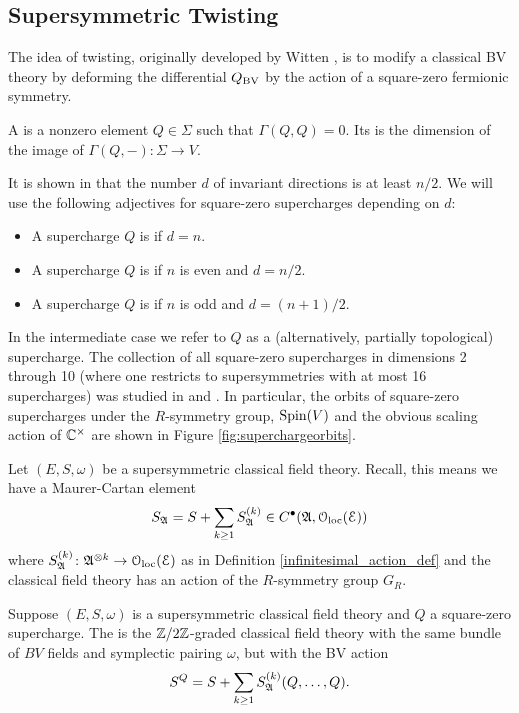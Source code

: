 \documentclass[10pt, oneside]{article}
\begin{document}
\subsection{Supersymmetric Twisting}
The idea of twisting, originally developed by Witten \cite{WittenTQFT}, is to modify a classical BV theory by deforming the differential $Q_{\mathrm{BV}}$ by the action of a square-zero fermionic symmetry. 

\begin{definition}
A  is a nonzero element $Q\in\Sigma$ such that $\Gamma(Q, Q)=0$. Its  is the dimension of the image of $\Gamma(Q, -)\colon \Sigma\rightarrow V$.
\end{definition}

It is shown in \cite[Proposition 3.25]{ElliottSafronov} that the number $d$ of invariant directions is at least $n/2$. We will use the following adjectives for square-zero supercharges depending on $d$:
\begin{itemize}
\item A supercharge $Q$ is  if $d = n$.

\item A supercharge $Q$ is  if $n$ is even and $d=n/2$.

\item A supercharge $Q$ is  if $n$ is odd and $d=(n+1)/2$.
\end{itemize}

In the intermediate case we refer to $Q$ as a  (alternatively, partially topological) supercharge. The collection of all square-zero supercharges in dimensions 2 through 10 (where one restricts to supersymmetries with at most 16 supercharges) was studied in \cite{ElliottSafronov} and \cite{EagerSaberiWalcher}. In particular, the orbits of square-zero supercharges under the $R$-symmetry group, $\mathrm{Spin}(V)$ and the obvious scaling action of $\mathbb C^\times$ are shown in Figure \ref{fig:superchargeorbits}.

Let $(E, S, \omega)$ be a supersymmetric classical field theory. 
Recall, this means we have a Maurer-Cartan element 
\[
S_{\mathfrak A} = S + \sum_{k \geq 1} S_{\mathfrak A}^{(k)} \in C^\bullet(\mathfrak A, \mathcal{O}_{\rm loc}(\mathcal E))
\]
where $S_{\mathfrak A}^{(k)}\colon \mathfrak A^{\otimes k} \to \mathcal{O}_{\rm loc}(\mathcal E)$ as in Definition \ref{infinitesimal_action_def} and the classical field theory has an action of the $R$-symmetry group $G_R$.

\begin{definition} \label{def:twisting}
Suppose $(E, S, \omega)$ is a supersymmetric classical field theory and $Q$ a square-zero supercharge. The  is the $\mathbb Z/2\mathbb Z$-graded classical field theory with the same bundle of $BV$ fields and symplectic pairing $\omega$, but with the BV action
\[S^Q = S + \sum_{k \geq 1} S_{\mathfrak A}^{(k)}(Q, \dots, Q).\]
\end{definition}
\end{document}
